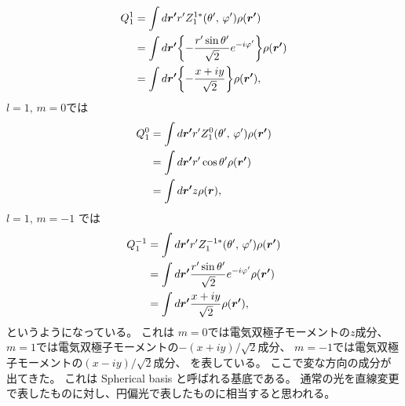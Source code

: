 \documentclass[../../master.tex]{subfiles}
\begin{document}
\begin{align}
    Q_1^{ 1}
    &= \int d\vb*{r'}  r' Z_1^{1*} (\theta',\,\varphi') \rho(\vb*{r'})\\
    &= \int d\vb*{r'} \qty{- \frac{r'\sin\theta'}{\sqrt{2}}e^{- i\varphi'}} \rho(\vb*{r'})\\
    &= \int d\vb*{r'} \qty{- \frac{x+iy}{\sqrt{2}}} \rho(\vb*{r'}),
\end{align}
\(l=1,\,m=0\)では
\begin{align}
    Q_1^0
    &= \int d\vb*{r'}  r' Z_1^0 (\theta',\,\varphi') \rho(\vb*{r'})\\
    &= \int d\vb*{r'}  r' \cos\theta' \rho(\vb*{r'})\\
    &= \int d\vb*{r'} z \rho(\vb*{r}),
\end{align}
\(l=1,\,m=-1\) では
\begin{align}
    Q_1^{- 1}
    &= \int d\vb*{r'}  r' Z_1^{- 1*} (\theta',\,\varphi') \rho(\vb*{r'})\\
    &= \int d\vb*{r'} \frac{r'\sin\theta'}{\sqrt{2}}e^{- i\varphi'} \rho(\vb*{r'})\\
    &= \int d\vb*{r'} \frac{x+iy}{\sqrt{2}} \rho(\vb*{r'}),
\end{align}
というようになっている。
これは
\(m=0\)では電気双極子モーメントの\(z\)成分、
\(m=1\)では電気双極子モーメントの\(-(x+iy)/\sqrt{2}\)成分、
\(m=-1\)では電気双極子モーメントの\((x-iy)/\sqrt{2}\)成分、
を表している。
ここで変な方向の成分が出てきた。
これは Spherical basis と呼ばれる基底である。
通常の光を直線変更で表したものに対し、円偏光で表したものに相当すると思われる。

\end{document}
